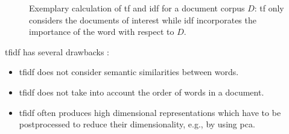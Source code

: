 \begin{figure}[!htb] %
    \centering
    
    \caption[Exemplary calculation of \acs*{tf} and \acs*{idf} values]{
        Exemplary calculation of \acs*{tf} and \acs*{idf} for a document corpus $D$: 
        \acs*{tf} only considers the documents of interest while 
        \acs*{idf} incorporates the importance of the word with respect to $D$.
    }
    \label{fig:tfidf-calculation}
\end{figure}

\ac{tfidf} has several drawbacks \cite{clusteringDocs2020,tfidf2008}:
\begin{itemize}
    \item \ac{tfidf} does not consider semantic similarities between words.
    \item \ac{tfidf} does not take into account the order of words in a document.
    \item \ac{tfidf} often produces high dimensional representations which have to be postprocessed to reduce their dimensionality, e.g., by using \ac{pca}.
\end{itemize}

